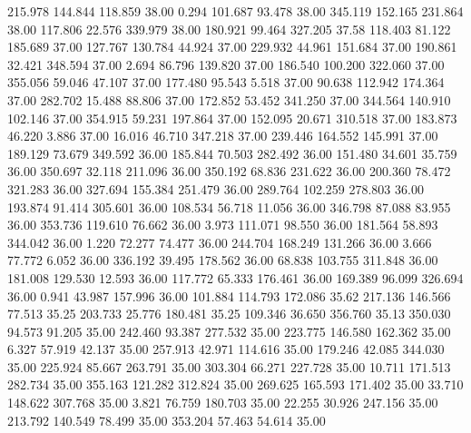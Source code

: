  215.978  144.844  118.859        38.00
   0.294  101.687   93.478        38.00
 345.119  152.165  231.864        38.00
 117.806   22.576  339.979        38.00
 180.921   99.464  327.205        37.58
 118.403   81.122  185.689        37.00
 127.767  130.784   44.924        37.00
 229.932   44.961  151.684        37.00
 190.861   32.421  348.594        37.00
   2.694   86.796  139.820        37.00
 186.540  100.200  322.060        37.00
 355.056   59.046   47.107        37.00
 177.480   95.543    5.518        37.00
  90.638  112.942  174.364        37.00
 282.702   15.488   88.806        37.00
 172.852   53.452  341.250        37.00
 344.564  140.910  102.146        37.00
 354.915   59.231  197.864        37.00
 152.095   20.671  310.518        37.00
 183.873   46.220    3.886        37.00
  16.016   46.710  347.218        37.00
 239.446  164.552  145.991        37.00
 189.129   73.679  349.592        36.00
 185.844   70.503  282.492        36.00
 151.480   34.601   35.759        36.00
 350.697   32.118  211.096        36.00
 350.192   68.836  231.622        36.00
 200.360   78.472  321.283        36.00
 327.694  155.384  251.479        36.00
 289.764  102.259  278.803        36.00
 193.874   91.414  305.601        36.00
 108.534   56.718   11.056        36.00
 346.798   87.088   83.955        36.00
 353.736  119.610   76.662        36.00
   3.973  111.071   98.550        36.00
 181.564   58.893  344.042        36.00
   1.220   72.277   74.477        36.00
 244.704  168.249  131.266        36.00
   3.666   77.772    6.052        36.00
 336.192   39.495  178.562        36.00
  68.838  103.755  311.848        36.00
 181.008  129.530   12.593        36.00
 117.772   65.333  176.461        36.00
 169.389   96.099  326.694        36.00
   0.941   43.987  157.996        36.00
 101.884  114.793  172.086        35.62
 217.136  146.566   77.513        35.25
 203.733   25.776  180.481        35.25
 109.346   36.650  356.760        35.13
 350.030   94.573   91.205        35.00
 242.460   93.387  277.532        35.00
 223.775  146.580  162.362        35.00
   6.327   57.919   42.137        35.00
 257.913   42.971  114.616        35.00
 179.246   42.085  344.030        35.00
 225.924   85.667  263.791        35.00
 303.304   66.271  227.728        35.00
  10.711  171.513  282.734        35.00
 355.163  121.282  312.824        35.00
 269.625  165.593  171.402        35.00
  33.710  148.622  307.768        35.00
   3.821   76.759  180.703        35.00
  22.255   30.926  247.156        35.00
 213.792  140.549   78.499        35.00
 353.204   57.463   54.614        35.00
